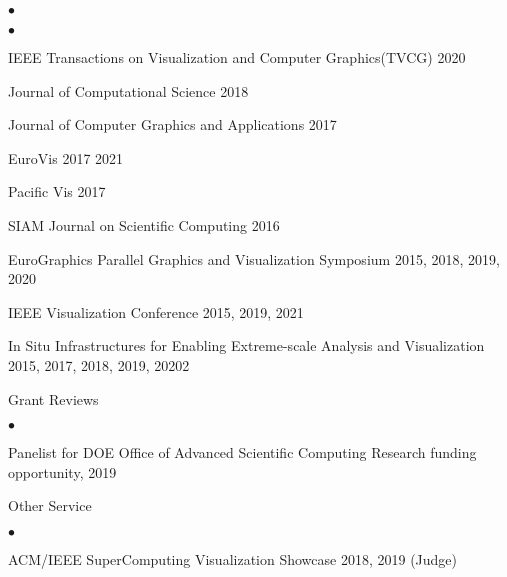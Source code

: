 \documentclass[margin,line]{res}
\newenvironment{list2}{
  \begin{list}{$\bullet$}{%
      \setlength{\itemsep}{0in}
      \setlength{\parsep}{0in} \setlength{\parskip}{0in}
      \setlength{\topsep}{0in} \setlength{\partopsep}{0in}
      \setlength{\leftmargin}{0.2in}}}{\end{list}}
\begin{document}
\begin{resume}
\begin{list2}
	\begin{list2}
		\item IEEE Transactions on Visualization and Computer Graphics(TVCG) 2020
		\item Journal of Computational Science 2018
		\item Journal of Computer Graphics and Applications 2017
		\item EuroVis 2017 2021
		\item Pacific Vis 2017
		\item SIAM Journal on Scientific Computing 2016
		\item EuroGraphics Parallel Graphics and Visualization Symposium 2015, 2018, 2019, 2020
		\item IEEE Visualization Conference 2015, 2019, 2021
		\item In Situ Infrastructures for Enabling Extreme-scale Analysis and Visualization  2015, 2017, 2018, 2019, 20202
	\end{list2}
	\item Grant Reviews
	\begin{list2}
    \item Panelist for DOE Office of Advanced Scientific Computing Research funding opportunity, 2019
	\end{list2}
	\item Other Service
	\begin{list2}
		\item ACM/IEEE SuperComputing Visualization Showcase 2018, 2019 (Judge)
	\end{list2}
\end{list2}
\end{resume}
\end{document}
